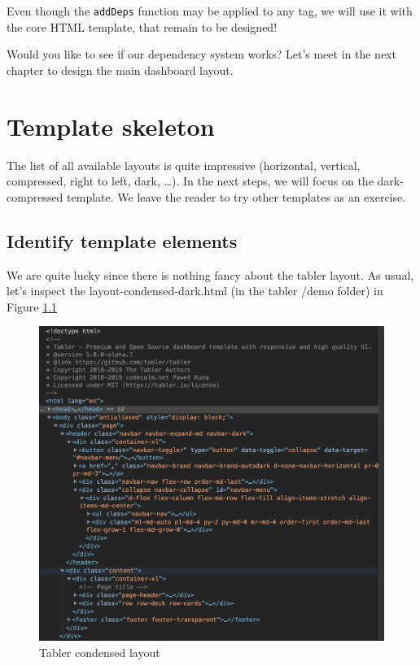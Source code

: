 \documentclass[]{book}
\begin{document}
Even though the \texttt{addDeps} function may be applied to any tag, we will use it with the core HTML template, that remain to be designed!

Would you like to see if our dependency system works? Let's meet in the next chapter to design the main dashboard layout.

\hypertarget{custom-templates-skeleton}{%
\chapter{Template skeleton}\label{custom-templates-skeleton}}

The list of all available layouts is quite impressive (horizontal, vertical, compressed, right to left, dark, \ldots{}). In the next steps, we will focus on the dark-compressed template. We leave the reader to try other templates as an exercise.

\hypertarget{identify-template-elements}{%
\section{Identify template elements}\label{identify-template-elements}}

We are quite lucky since there is nothing fancy about the tabler layout. As usual, let's inspect the layout-condensed-dark.html (in the tabler /demo folder) in Figure \ref{fig:tabler-layout-intro}

\begin{figure}
\includegraphics[width=17.56in]{images/practice/tabler-layout-intro} \caption{Tabler condensed layout}\label{fig:tabler-layout-intro}
\end{figure}
\end{document}
